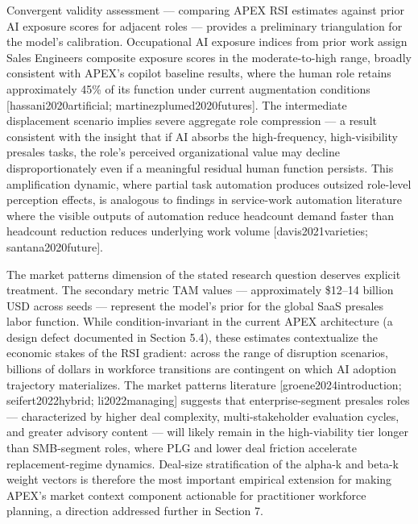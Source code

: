 \documentclass[10pt, conference]{IEEEtran}
\begin{document}
Convergent validity assessment --- comparing APEX RSI estimates against prior AI exposure scores for adjacent roles --- provides a preliminary triangulation for the model's calibration. Occupational AI exposure indices from prior work assign Sales Engineers composite exposure scores in the moderate-to-high range, broadly consistent with APEX's copilot baseline results, where the human role retains approximately 45\% of its function under current augmentation conditions [hassani2020artificial; martinezplumed2020futures]. The intermediate displacement scenario implies severe aggregate role compression --- a result consistent with the insight that if AI absorbs the high-frequency, high-visibility presales tasks, the role's perceived organizational value may decline disproportionately even if a meaningful residual human function persists. This amplification dynamic, where partial task automation produces outsized role-level perception effects, is analogous to findings in service-work automation literature where the visible outputs of automation reduce headcount demand faster than headcount reduction reduces underlying work volume [davis2021varieties; santana2020future].

The market patterns dimension of the stated research question deserves explicit treatment. The secondary metric TAM values --- approximately \$12--14 billion USD across seeds --- represent the model's prior for the global SaaS presales labor function. While condition-invariant in the current APEX architecture (a design defect documented in Section 5.4), these estimates contextualize the economic stakes of the RSI gradient: across the range of disruption scenarios, billions of dollars in workforce transitions are contingent on which AI adoption trajectory materializes. The market patterns literature [groene2024introduction; seifert2022hybrid; li2022managing] suggests that enterprise-segment presales roles --- characterized by higher deal complexity, multi-stakeholder evaluation cycles, and greater advisory content --- will likely remain in the high-viability tier longer than SMB-segment roles, where PLG and lower deal friction accelerate replacement-regime dynamics. Deal-size stratification of the alpha-k and beta-k weight vectors is therefore the most important empirical extension for making APEX's market context component actionable for practitioner workforce planning, a direction addressed further in Section 7.
\end{document}
